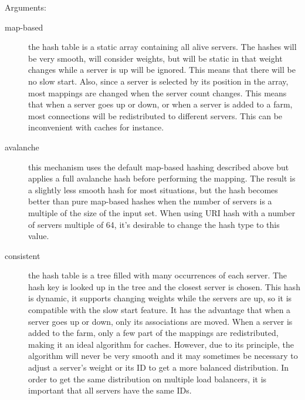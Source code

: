   Arguments:
  \begin{description}
  \item[map-based]   the hash table is a static array containing all alive servers.
                The hashes will be very smooth, will consider weights, but will
                be static in that weight changes while a server is up will be
                ignored. This means that there will be no slow start. Also,
                since a server is selected by its position in the array, most
                mappings are changed when the server count changes. This means
                that when a server goes up or down, or when a server is added
                to a farm, most connections will be redistributed to different
                servers. This can be inconvenient with caches for instance.

  \item[avalanche]   this mechanism uses the default map-based hashing described
                above but applies a full avalanche hash before performing the
                mapping. The result is a slightly less smooth hash for most
                situations, but the hash becomes better than pure map-based
                hashes when the number of servers is a multiple of the size of
                the input set. When using URI hash with a number of servers
                multiple of 64, it's desirable to change the hash type to
                this value.

  \item[consistent]  the hash table is a tree filled with many occurrences of each
                server. The hash key is looked up in the tree and the closest
                server is chosen. This hash is dynamic, it supports changing
                weights while the servers are up, so it is compatible with the
                slow start feature. It has the advantage that when a server
                goes up or down, only its associations are moved. When a server
                is added to the farm, only a few part of the mappings are
                redistributed, making it an ideal algorithm for caches.
                However, due to its principle, the algorithm will never be very
                smooth and it may sometimes be necessary to adjust a server's
                weight or its ID to get a more balanced distribution. In order
                to get the same distribution on multiple load balancers, it is
                important that all servers have the same IDs.
  \end{description}

